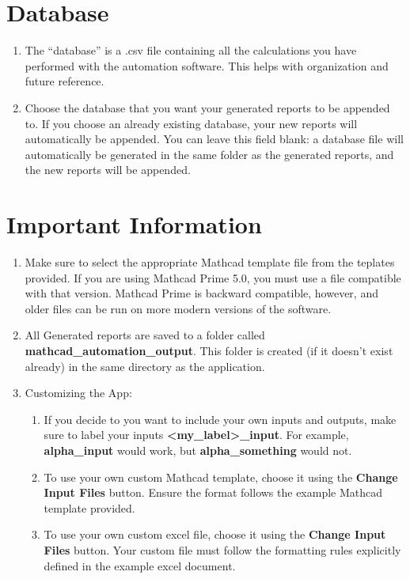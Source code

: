 \documentclass[11pt]{article}
\begin{document}
\section{Database}
\label{sec:orga17cb46}
\begin{enumerate}
\item The ``database'' is a .csv file containing all the calculations you have performed with the automation software. This helps with organization and future reference.
\item Choose the database that you want your generated reports to be appended to. If you choose an already existing database, your new reports will automatically be appended. You can leave this field blank: a database file will automatically be generated in the same folder as the generated reports, and the new reports will be appended.
\end{enumerate}
\section{Important Information}
\label{sec:org36fcba3}
\begin{enumerate}
\item Make sure to select the appropriate Mathcad template file from the teplates provided. If you are using Mathcad Prime 5.0, you must use a file compatible with that version. Mathcad Prime is backward compatible, however, and older files can be run on more modern versions of the software.
\item All Generated reports are saved to a folder called \textbf{mathcad\_automation\_output}. This folder is created (if it doesn't exist already) in the same directory as the application.
\item Customizing the App:
\begin{enumerate}
\item If you decide to you want to include your own inputs and outputs, make sure to label your inputs \textbf{<my\_label>\_input}. For example, \textbf{alpha\_input} would work, but \textbf{alpha\_something} would not.
\item To use your own custom Mathcad template, choose it using the \textbf{Change Input Files} button. Ensure the format follows the example Mathcad template provided.
\item To use your own custom excel file, choose it using the \textbf{Change Input Files} button. Your custom file must follow the formatting rules explicitly defined in the example excel document.
\end{enumerate}
\end{enumerate}
\end{document}
